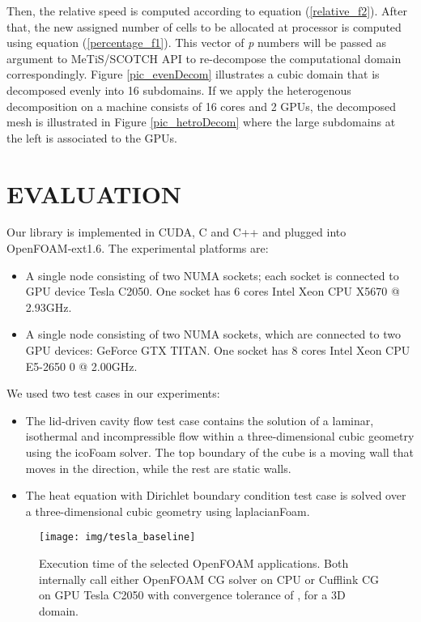 \documentclass[3p,times]{elsarticle}
\begin{document}
Then, the relative speed \emph{} is computed according to equation (\ref{relative_f2}). After that, the new assigned number of cells to be allocated at processor \emph{} is computed using equation (\ref{percentage_f1}). This vector of \emph{p} numbers  will be passed as argument to MeTiS/SCOTCH API to re-decompose the computational domain correspondingly. Figure \ref{pic_evenDecom} illustrates a cubic domain that is decomposed evenly into 16 subdomains. If we apply the heterogenous decomposition  on a machine consists of 16 cores and 2 GPUs, the decomposed mesh is illustrated in Figure \ref{pic_hetroDecom} where the large subdomains at the left is associated to the GPUs. \\

\section{EVALUATION}
Our library is implemented in CUDA, C and C++ and plugged into OpenFOAM-ext1.6. The experimental platforms are: 
\begin{itemize}
\item A single node consisting of two NUMA sockets; each socket is connected to GPU device Tesla C2050. One socket has 6 cores Intel Xeon CPU X5670  @ 2.93GHz. 
\item A single node consisting of two NUMA sockets, which are connected to two GPU devices: GeForce GTX TITAN. One socket has 8 cores Intel Xeon CPU E5-2650 0 @ 2.00GHz. 
\end{itemize}
We used two test cases in our experiments:
\begin{itemize}
\item The lid-driven cavity flow test case contains the solution of a laminar, isothermal and incompressible flow within a three-dimensional cubic geometry using the icoFoam solver. The top boundary of the cube is a moving wall that moves in the \emph{} direction, while the rest are static walls.
\item The heat equation with Dirichlet boundary condition test case is solved over a three-dimensional cubic geometry using laplacianFoam.
\end{itemize}


\begin{figure}[h!]
\begin{center}
\texttt{[image: img/tesla\_baseline]} 
\caption{ Execution time of the selected OpenFOAM applications. Both internally call either OpenFOAM CG solver on CPU or Cufflink CG on GPU Tesla C2050 with convergence tolerance of , for a  3D domain.}
\label{tesla_base}
\end{center}
\end{figure}
\end{document}
